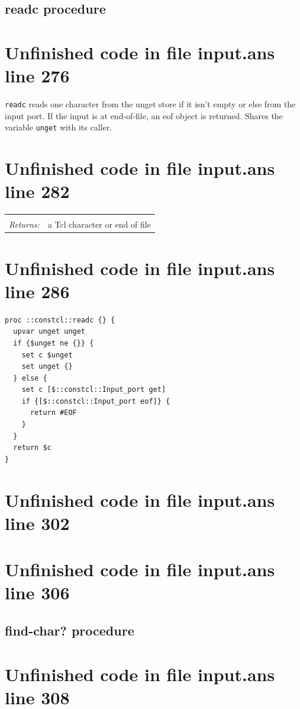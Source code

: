 \documentclass[twoside,9pt]{report}
\begin{document}
\subsection{readc procedure}
\label{readc-procedure}
\section{Unfinished code in file input.ans line 276}


\texttt{readc} reads one character from the unget store if it isn't empty or else from the input port. If the input is at end-of-file, an eof object is returned. Shares the variable \texttt{unget} with its caller.

\section{Unfinished code in file input.ans line 282}
\noindent\begin{tabular}{ |p{1.9cm} p{8cm}| }
\hline
\rowcolor[HTML]{CCCCCC} \multicolumn{2}{|l|}{\bf readc (internal)} \\
\textit{Returns:} & a Tcl character or end of file \\
\hline
\end{tabular}
\section{Unfinished code in file input.ans line 286}
\begin{lstlisting}
proc ::constcl::readc {} {
  upvar unget unget
  if {$unget ne {}} {
    set c $unget
    set unget {}
  } else {
    set c [$::constcl::Input_port get]
    if {[$::constcl::Input_port eof]} {
      return #EOF
    }
  }
  return $c
}
\end{lstlisting}
\section{Unfinished code in file input.ans line 302}
\section{Unfinished code in file input.ans line 306}
\subsection{find-char? procedure}
\label{find-char?-procedure}
\section{Unfinished code in file input.ans line 308}
\end{document}
